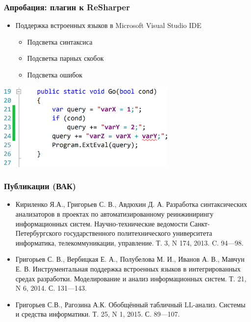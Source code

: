 \documentclass{beamer}
\begin{document}
\begin{frame}[t]
    \transwipe[direction=90]
    \frametitle{Апробация: плагин к ReSharper}
        \begin{itemize}
            \item Поддержка встроенных языков в Microsoft Visual Studio IDE
            \begin{itemize}
                \item Подсветка синтаксиса
                \item Подсветка парных скобок
                \item Подсветка ошибок
            \end{itemize}
        \end{itemize}
    \begin{center}
      \includegraphics[width=250pt]{pictures/RShExampe.png}
    \end{center}
\end{frame}

\begin{frame}
    \transwipe[direction=90]
    \frametitle{Публикации (ВАК)}
  \begin{itemize}
      \item Кириленко Я.А., Григорьев С. В., Авдюхин Д. А. Разработка синтаксических анализаторов в проектах по автоматизированному реинжинирингу информационных систем.  Научно-технические ведомости Санкт-Петербургского государственного политехнического университета информатика, телекоммуникации, управление. Т. 3, N 174, 2013. C. 94---98.
      \item Григорьев С. В., Вербицкая Е. А., Полубелова М. И., Иванов А. В., Мавчун Е. В. Инструментальная поддержка встроенных языков в интегрированных средах разработки. Моделирование и анализ информационных систем. Т. 21, N 6, 2014. С. 131---143.
      \item Григорьев С.В., Рагозина А.К. Обобщённый табличный LL-анализ. Системы и средства информатики. Т. 25, N 1, 2015. С. 89---107.
  \end{itemize} 
\end{frame}
\end{document}
